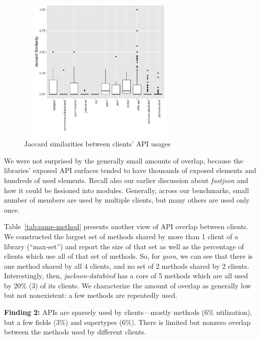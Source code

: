 \begin{center}
\begin{figure}
\centering
\includegraphics[width=8cm, height=7cm]{./images/jac-sim-box-plot-declared}
\caption{\label{fig:jaccard}Jaccard similarities between clients' API usages}
\end{figure}
\end{center}


We were not surprised by the generally small amounts of overlap, because the libraries' exposed API surfaces tended
to have thousands of exposed elements and hundreds of used elements. Recall also our earlier discussion about \emph{fastjson} and how it could be fissioned into modules. Generally, across our benchmarks, small number of members are used by
multiple clients, but many others are used only once.

Table~\ref{tab:same-method} presents another view of API overlap between clients. We constructed the largest set
of methods shared by more than 1 client of a library (``max-set'') and report the size of that set as well as the percentage
of clients which use all of that set of methods. So, for \emph{gson}, we can see that there is one method shared
by all 4 clients, and no set of 2 methods shared by 2 clients. Interestingly, then, \emph{jackson-databind} has a core of 5
methods which are all used by 20\% (3) of its clients. We characterize the amount of overlap as generally low but not
nonexistent: a few methods are repeatedly used.




\begin{mdframed}[
  leftmargin=\parindent,
  rightmargin=\parindent,
  skipabove=\topsep,
  skipbelow=\topsep
  ]
{\bf Finding 2:} APIs are sparsely used by clients---mostly methods (6\% utilization), but a few fields (3\%) and supertypes (6\%). There is limited but nonzero overlap between the methods used by different clients.
\end{mdframed}

